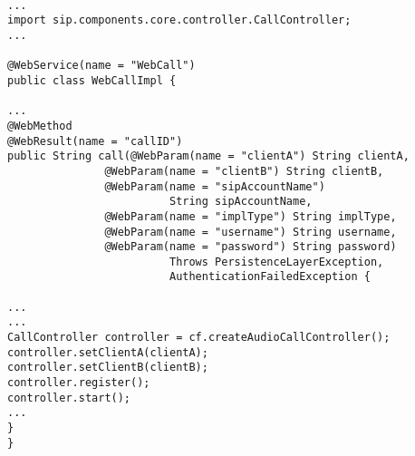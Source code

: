 \lstset{language=Java}
\lstset{basicstyle=\small}

\begin{lstlisting}[frame=lines, float=!tbph, caption=Web Service implementation (fragment), label=WebServiceImplementation]

...
import sip.components.core.controller.CallController;
...

@WebService(name = "WebCall")
public class WebCallImpl {

...
@WebMethod
@WebResult(name = "callID")
public String call(@WebParam(name = "clientA") String clientA,
               @WebParam(name = "clientB") String clientB,
               @WebParam(name = "sipAccountName") 
                         String sipAccountName,
               @WebParam(name = "implType") String implType,
               @WebParam(name = "username") String username,
               @WebParam(name = "password") String password)
                         Throws PersistenceLayerException, 
                         AuthenticationFailedException {
                             
...
...
CallController controller = cf.createAudioCallController();
controller.setClientA(clientA);
controller.setClientB(clientB);
controller.register();
controller.start();
...
}
}
\end{lstlisting}


